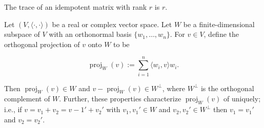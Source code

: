The trace of an idempotent matrix with rank \(r\) is \(r\).

\begin{theorem}

Let \((V, \langle \cdot, \cdot \rangle)\) be a real or complex vector space. Let \(W\) be a finite-dimensional subspace of \(V\) with an orthonormal basis \(\{w_1, \ldots, w_n\}\). For \(v \in V\), define the orthogonal projection of \(v\) onto \(W\) to be

\[
\operatorname{proj}_W(v) :=  \sum_{i=1}^n \langle w_i, v \rangle w_i.
\]

Then \(\operatorname{proj}_W(v)  \in W\) and \(v - \operatorname{proj}_W(v) \in W^\perp\), where \(W^\perp\) is the orthogonal complement of \(W\). Further, these properties characterize \(\operatorname{proj}_W(v) \) of uniquely; i.e., if \(v = v_1 + v_2 = v-1' + v_2'\) with \(v_1, v_1' \in W\) and \(v_2, v_2' \in W^\perp\) then \(v_1 = v_1'\) and \(v_2 = v_2'\).

\end{theorem}

